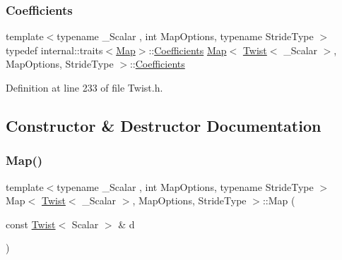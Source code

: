 \subsubsection{\texorpdfstring{Coefficients}{Coefficients}}
{\footnotesize\ttfamily template$<$typename \+\_\+\+Scalar , int Map\+Options, typename Stride\+Type $>$ \\
typedef internal\+::traits$<$\hyperlink{class_map_3_01_twist_3_01___scalar_01_4_00_01_map_options_00_01_stride_type_01_4_a7bc49d9365cdda555f4d107d55a1c6b2}{Map}$>$\+::\hyperlink{class_map_3_01_twist_3_01___scalar_01_4_00_01_map_options_00_01_stride_type_01_4_aed5862495c86340dcb689412d79eb66a}{Coefficients} \hyperlink{class_map_3_01_twist_3_01___scalar_01_4_00_01_map_options_00_01_stride_type_01_4_a7bc49d9365cdda555f4d107d55a1c6b2}{Map}$<$ \hyperlink{class_twist}{Twist}$<$ \+\_\+\+Scalar $>$, Map\+Options, Stride\+Type $>$\+::\hyperlink{class_map_3_01_twist_3_01___scalar_01_4_00_01_map_options_00_01_stride_type_01_4_aed5862495c86340dcb689412d79eb66a}{Coefficients}}



Definition at line 233 of file Twist.\+h.



\subsection{Constructor \& Destructor Documentation}
\hypertarget{class_map_3_01_twist_3_01___scalar_01_4_00_01_map_options_00_01_stride_type_01_4_a7bc49d9365cdda555f4d107d55a1c6b2}{}\label{class_map_3_01_twist_3_01___scalar_01_4_00_01_map_options_00_01_stride_type_01_4_a7bc49d9365cdda555f4d107d55a1c6b2} 
\subsubsection{\texorpdfstring{Map()}{Map()}\hspace{0.1cm}{\footnotesize\ttfamily [1/4]}}
{\footnotesize\ttfamily template$<$typename \+\_\+\+Scalar , int Map\+Options, typename Stride\+Type $>$ \\
Map$<$ \hyperlink{class_twist}{Twist}$<$ \+\_\+\+Scalar $>$, Map\+Options, Stride\+Type $>$\+::Map (\begin{DoxyParamCaption}\item[{const \hyperlink{class_twist}{Twist}$<$ Scalar $>$ \&}]{d }\end{DoxyParamCaption})\hspace{0.3cm}{\ttfamily [inline]}}



